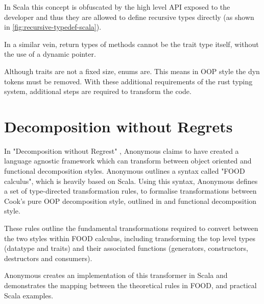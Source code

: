 \documentclass[ oneside,%
                    author={James Elgar},
                    degree={MEng},
                     title={Bidirectional transformer between functional and \\ object-oriented programming in Rust},
                  subtitle={}]{dissertation}
\newcommand{\weixin}{Anonymous }
\begin{document}
In Scala this concept is obfuscated by the high level API exposed to the developer and thus they are allowed to define recursive types directly (as shown in \autoref{fig:recursive-typedef-scala}).  

In a similar vein, return types of methods cannot be the trait type itself, without the use of a dynamic pointer. 

Although traits are not a fixed size, enums are. This means in OOP style the dyn tokens must be removed. With these additional requirements of the rust typing system, additional steps are required to transform the code.

\section{Decomposition without Regrets}

In "Decomposition without Regrest" \cite{food}, \weixin claims to have created a language agnostic framework which can transform between object oriented and functional decomposition styles. \weixin outlines a syntax called "FOOD calculus", which is heavily based on Scala. Using this syntax, \weixin defines a set of type-directed transformation rules, to formalise transformations between Cook's pure OOP decomposition style, outlined in \cite{food} and functional decomposition style.

These rules outline the fundamental transformations required to convert between the two styles within FOOD calculus, including transforming the top level types (datatype and traits) and their associated functions (generators, constructors, destructors and consumers).


\weixin creates an implementation of this transformer in Scala and demonstrates the mapping between the theoretical rules in FOOD, and practical Scala examples.




\end{document}
